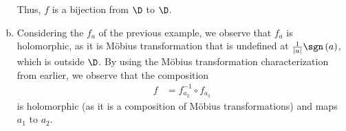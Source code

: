 \documentclass[10pt]{mypackage}
\begin{document}
\begin{solution}
\begin{enumerate}[(a)]
      Thus, $f$ is a bijection from $\D$ to $\D$.
    \item Considering the $f_a$ of the previous example, we observe that $f_a$ is holomorphic, as it is Möbius transformation that is undefined at $ \frac{1}{\left\vert a \right\vert} \sgn\left( a \right) $, which is outside $\D$. By using the Möbius transformation characterization from earlier, we observe that the composition
      \begin{align*}
        f &= f_{a_2}^{-1}\circ f_{a_1}
      \end{align*}
      is holomorphic (as it is a composition of Möbius transformations) and maps $a_1$ to $a_2$.
  \end{enumerate}
\end{solution}
\end{document}
